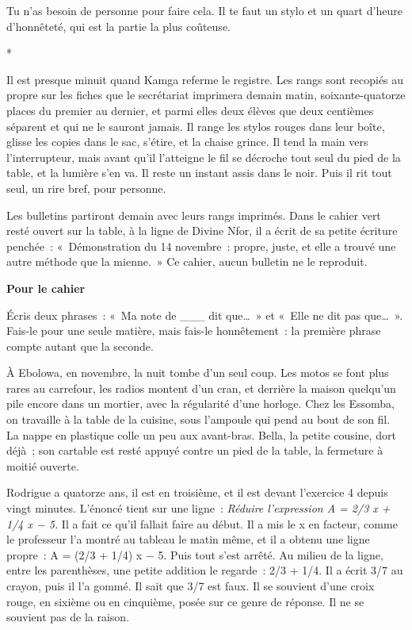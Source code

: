 \documentclass[10.5pt,twoside,openright]{book}
\newcommand{\asterisme}{\par\vspace{0.7em}\centerline{\color{gris}*\quad*\quad*}\vspace{0.7em}\par\noindent}
\newenvironment{pourcahier}[1]{\par\vspace{0.9em}\begin{tcolorbox}[colback=black!4,colframe=accent,boxrule=0pt,leftrule=2.2pt,arc=0pt,left=8pt,right=8pt,top=5pt,bottom=5pt]\small\textbf{#1}\par\smallskip}{\end{tcolorbox}\par}
\newcommand{\chapitre}[2]{\cleardoublepage\markright{#2}\thispagestyle{plain}\vspace*{2.2cm}{\noindent\color{accent}\fontsize{54}{54}\selectfont\bfseries #1}\par\vspace{0.5em}{\noindent\LARGE\bfseries #2\par}\vspace{1.6em}\noindent\ignorespaces}
\begin{document}
Tu n’as besoin de personne pour faire cela. Il te faut un stylo et un quart d’heure d’honnêteté, qui est la partie la plus coûteuse.

\asterisme

Il est presque minuit quand Kamga referme le registre. Les rangs sont recopiés au propre sur les fiches que le secrétariat imprimera demain matin, soixante-quatorze places du premier au dernier, et parmi elles deux élèves que deux centièmes séparent et qui ne le sauront jamais. Il range les stylos rouges dans leur boîte, glisse les copies dans le sac, s’étire, et la chaise grince. Il tend la main vers l’interrupteur, mais avant qu’il l’atteigne le fil se décroche tout seul du pied de la table, et la lumière s’en va. Il reste un instant assis dans le noir. Puis il rit tout seul, un rire bref, pour personne.

Les bulletins partiront demain avec leurs rangs imprimés. Dans le cahier vert resté ouvert sur la table, à la ligne de Divine Nfor, il a écrit de sa petite écriture penchée : « Démonstration du 14 novembre : propre, juste, et elle a trouvé une autre méthode que la mienne. » Ce cahier, aucun bulletin ne le reproduit.

\begin{pourcahier}{Pour le cahier}
Écris deux phrases : « Ma note de \_\_\_ dit que… » et « Elle ne dit pas que… ». Fais-le pour une seule matière, mais fais-le honnêtement : la première phrase compte autant que la seconde.
\end{pourcahier}


\chapitre{2}{Les marches manquantes}

À Ebolowa, en novembre, la nuit tombe d’un seul coup. Les motos se font plus rares au carrefour, les radios montent d’un cran, et derrière la maison quelqu’un pile encore dans un mortier, avec la régularité d’une horloge. Chez les Essomba, on travaille à la table de la cuisine, sous l’ampoule qui pend au bout de son fil. La nappe en plastique colle un peu aux avant-bras. Bella, la petite cousine, dort déjà ; son cartable est resté appuyé contre un pied de la table, la fermeture à moitié ouverte.

Rodrigue a quatorze ans, il est en troisième, et il est devant l’exercice 4 depuis vingt minutes. L’énoncé tient sur une ligne : \emph{Réduire l’expression A = 2/3 x + 1/4 x − 5.} Il a fait ce qu’il fallait faire au début. Il a mis le x en facteur, comme le professeur l’a montré au tableau le matin même, et il a obtenu une ligne propre : A = (2/3 + 1/4) x − 5. Puis tout s’est arrêté. Au milieu de la ligne, entre les parenthèses, une petite addition le regarde : 2/3 + 1/4. Il a écrit 3/7 au crayon, puis il l’a gommé. Il sait que 3/7 est faux. Il se souvient d’une croix rouge, en sixième ou en cinquième, posée sur ce genre de réponse. Il ne se souvient pas de la raison.
\end{document}
